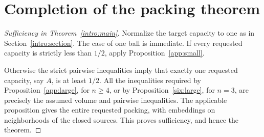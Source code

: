 \section{Completion of the packing theorem}\label{app:completion}

\begin{proof}[Sufficiency in Theorem~\ref{intro:main}]
Normalize the target capacity to one as in Section~\ref{intro:section}.
The case of one ball is immediate. If every requested capacity is
strictly less than \(1/2\), apply Proposition~\ref{app:small}.

Otherwise the strict pairwise inequalities imply that exactly one
requested capacity, say \(A\), is at least \(1/2\). All the inequalities
required by Proposition~\ref{app:large}, for \(n\ge4\), or by
Proposition~\ref{six:large}, for \(n=3\), are precisely the assumed
volume and pairwise inequalities. The applicable proposition gives
the entire requested packing, with embeddings on neighborhoods of
the closed sources. This proves sufficiency, and hence the theorem.
\end{proof}
